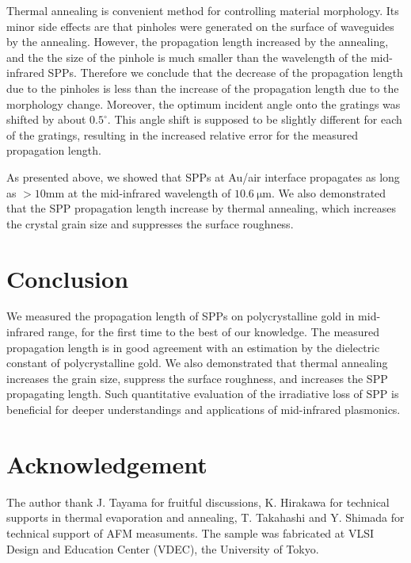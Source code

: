 \documentclass[twocolumn,10.5pt,a4]{article}
\begin{document}
Thermal annealing is convenient method for controlling material morphology\cite{Nogues}. Its minor side effects are that pinholes were generated on the surface of waveguides by the annealing. However, the propagation length increased by the annealing, and the the size of the pinhole is much smaller than the wavelength of the mid-infrared SPPs. Therefore we conclude that the decrease of the propagation length due to the pinholes is less than the increase of the propagation length due to the morphology change. 
Moreover, the optimum incident angle onto the gratings was shifted by about $0.5^\circ$. This angle shift is supposed to be slightly different for each of the gratings, resulting in the increased relative error for the measured propagation length.

As presented above, we showed that SPPs at Au/air interface propagates as long as $>10\mathrm{mm}$ at the mid-infrared wavelength of $10.6\:\mathrm{\mu m}$.
We also demonstrated that the SPP propagation length increase by thermal annealing, which increases the crystal grain size and suppresses the surface roughness.

\section{Conclusion}
\label{sec:conclusion}
We measured the propagation length of SPPs on polycrystalline gold in mid-infrared range, for the first time to the best of our knowledge. 
The measured propagation length is in good agreement with an estimation by the dielectric constant of polycrystalline gold.
We also demonstrated that thermal annealing increases the grain size, suppress the surface roughness, and increases the SPP propagating length. 
Such quantitative evaluation of the irradiative loss of SPP is beneficial for deeper understandings and applications of mid-infrared plasmonics.

\section*{Acknowledgement}
The author thank J. Tayama for fruitful discussions, K. Hirakawa for technical supports in thermal evaporation and annealing, T. Takahashi and Y. Shimada for  technical support of AFM measuments.
The sample was fabricated at VLSI Design and Education Center (VDEC), the University of Tokyo.




\newpage
\end{document}
